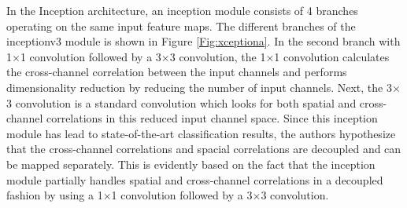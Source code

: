 In the Inception architecture, an inception module consists of 4 branches operating on the same input feature maps. The different branches of the inceptionv3 module is shown in Figure \ref{Fig:xceptiona}. In the second branch with 1$\times$1 convolution followed by a 3$\times$3 convolution, the 1$\times$1 convolution calculates the cross-channel correlation between the input channels and performs dimensionality reduction by reducing the number of input channels. Next, the 3$\times$3 convolution is a standard convolution which looks for both spatial and cross-channel correlations in this reduced input channel space. Since this inception module has lead to state-of-the-art classification results, the authors hypothesize that the cross-channel correlations and spacial correlations are decoupled and can be mapped separately. This is evidently based on the fact that the inception module partially handles spatial and cross-channel correlations in a decoupled fashion by using a 1$\times$1 convolution followed by a 3$\times$3 convolution. 

